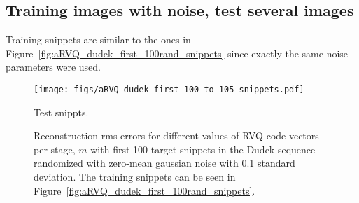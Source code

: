 \clearpage
\newpage
\subsection{Training images with noise, test several images}
Training snippets are similar to the ones in Figure~\ref{fig:aRVQ_dudek_first_100rand_snippets} since exactly the same noise parameters were used.


								\begin{figure}[h!]
								\centering
								\texttt{[image: figs/aRVQ\_dudek\_first\_100\_to\_105\_snippets.pdf]}
								\caption{Test snippts.}
								\label{fig:aRVQ_Dudek_first_100_rand}
								\end{figure}


								\begin{figure}[h]
								\centering
								\subtable{\begin{tiny}\end{tiny}}
								\caption{Reconstruction rms errors for different values of RVQ code-vectors per stage, $m$ with first 100 target snippets in the Dudek sequence randomized with zero-mean gaussian noise with 0.1 standard deviation.  The training snippets can be seen in Figure~\ref{fig:aRVQ_dudek_first_100rand_snippets}.}
								\label{fig:aRVQ_Dudek_first_100_rand}
								\end{figure}

\clearpage
\newpage
\normalsize


